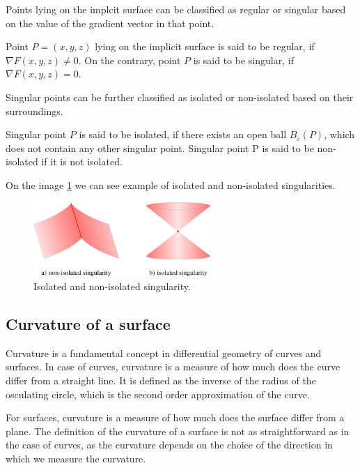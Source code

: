Points lying on the implcit surface can be classified as regular or
singular based on the value of the gradient vector in that point.

\begin{definition}
    Point $P=(x,y,z)$ lying on the implicit surface is said to be regular,
    if $\nabla F(x, y, z) \neq 0$. On the contrary, point $P$ is said to be 
    singular, if $\nabla F(x, y, z) = 0$.
\end{definition}

Singular points can be further classified as isolated or non-isolated
based on their surroundings.

\begin{definition}
    Singular point $P$ is said to be isolated, if there exists an open ball
    $B_\varepsilon(P)$, which does not contain any other singular point.
    Singular point P is said to be non-isolated if it is not isolated.
\end{definition}

On the image \ref{img:2} we can see example of isolated and non-isolated
singularities.

\begin{figure}
    \centerline{\includegraphics[width=0.6\textwidth]{images/img2}}
    \caption[Isolated and non-isolated singularity]
    {Isolated and non-isolated singularity.}
    \label{img:2}
\end{figure}

\subsection*{Curvature of a surface}

Curvature is a fundamental concept in differential geometry of curves and surfaces.
In case of curves, curvature is a measure of how much does the curve differ from a 
straight line. It is defined as the inverse of the radius of the osculating circle,
which is the second order approximation of the curve.

For surfaces, curvature is a measure of how much does the surface differ from a 
plane. The definition of the curvature of a surface is not as straightforward
as in the case of curves, as the curvature depends on the choice of the direction
in which we measure the curvature.

